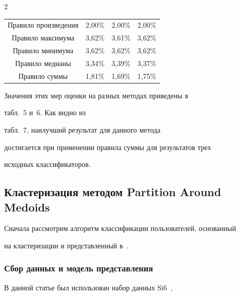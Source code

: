 \begin{multicols}{2}
\begin{center}
{\begin{tabular}{|c|c|c|c|}
Правило произведения & 2,00\% & 2,00\% &2,00\%\\

Правило максимума & 3,62\% & 3,61\% &3,62\%\\

Правило минимума & 3,62\% & 3,62\% &3,62\%\\

Правило медианы & 3,34\% & 3,39\% &3,37\%\\

Правило суммы & 1,81\% & 1,69\% &1,75\%\\

\hline

\end{tabular}

 }

\end{center}



\vspace*{6pt}



Значения этих мер оценки на разных методах приведены в

табл.~5 и~6. Как видно из

табл.~7, наилучший результат для данного метода

достигается при применении правила суммы для результатов трех

исходных классификаторов.







\addtocounter{table}{3}



\subsection{Кластеризация методом Partition Around Medoids}



Сначала рассмотрим алгоритм классификации пользователей, основанный

на кластеризации и представленный в~\cite{bert}.



\subsubsection{Сбор данных и модель представления}



В данной статье был использован набор данных {Si6}~\cite{si6}, 


\end{multicols}
